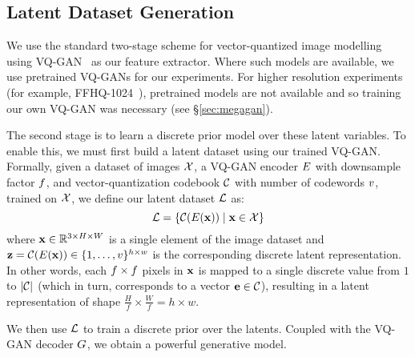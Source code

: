 
\subsection{Latent Dataset Generation}
We use the standard two-stage scheme for vector-quantized image
modelling~\cite{oord2018neural,razavi2019generating,esser2021taming,bondtaylor2021unleashing}
using VQ-GAN~\cite{esser2021taming} as our feature extractor. Where such models
are available, we use pretrained VQ-GANs for our experiments. For higher
resolution experiments (for example, FFHQ-1024~\cite{karras2019stylebased}),
pretrained models are not available and so training our own VQ-GAN was necessary
(see \S\ref{sec:megagan}).

The second stage is to learn a discrete prior model over these latent variables.
To enable this, we must first build a latent dataset using our trained VQ-GAN.
Formally, given a dataset of images $\mathcal{X}$, a VQ-GAN encoder
$E$ with downsample factor $f$, and
vector-quantization codebook $\mathcal{C}$ with number of codewords
$v$, trained on $\mathcal{X}$, we define our latent dataset
$\mathcal{L}$ as:
\begin{equation}
    \mathcal{L} = \{\mathcal{C}(E(\mathbf{x})) \mid \mathbf{x} \in \mathcal{X} \}
\end{equation}
where $\mathbf{x} \in \mathbb{R}^{3 \times H \times W}$ is a single element of the image
dataset and $\mathbf{z} = \mathcal{C}(E(\mathbf{x})) \in \{1, \dots,
v\}^{h \times w}$ is the corresponding discrete latent
representation. In other words, each $f \times f$
pixels in $\mathbf{x}$ is mapped to a single discrete value from $1$ to
$|\mathcal{C}|$ (which in turn, corresponds to a vector $\mathbf{e} \in
\mathcal{C}$),
resulting in a latent representation of shape $\frac{H}{f} \times \frac{W}{f} =
h \times w$.

We then use $\mathcal{L}$ to train a discrete prior over the latents. Coupled
with the VQ-GAN decoder $G$, we obtain a powerful generative model. 

